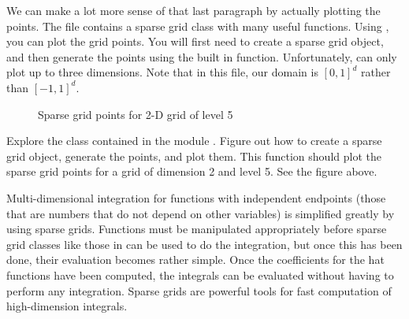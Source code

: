 We can make a lot more sense of that last paragraph by actually plotting the points.  The file  contains a sparse grid class with many useful functions.  Using , you can plot the grid points.  You will first need to create a sparse grid object, and then generate the points using the built in function.  Unfortunately,  can only plot up to three dimensions.  Note that in this file, our domain is $[0,1]^d$ rather than $[-1,1]^d$.  

\begin{center}
\begin{figure}
\caption{Sparse grid points for 2-D grid of level 5}
\label{fig:gridpoints}
\end{figure}
\end{center}




\begin{problem}
Explore the  class contained in the module . Figure out how to create a sparse grid object, generate the points, and plot them. This function should plot the sparse grid points for a grid of dimension 2 and level 5. See the figure above.
\end{problem}



Multi-dimensional integration for functions with independent endpoints (those that are numbers that do not depend on other variables) is simplified greatly by using sparse grids.  Functions must be manipulated appropriately before sparse grid classes like those in  can be used to do the integration, but once this has been done, their evaluation becomes rather simple.  Once the coefficients for the hat functions have been computed, the integrals can be evaluated without having to perform any integration.  Sparse grids are powerful tools for fast computation of high-dimension integrals.  

